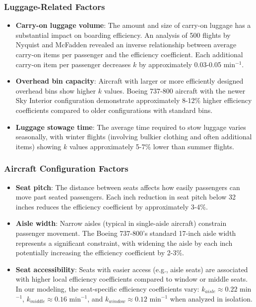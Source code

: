 \documentclass[12pt,a4paper]{article}
\begin{document}
\subsubsection{Luggage-Related Factors}
\begin{itemize}
    \item \textbf{Carry-on luggage volume}: The amount and size of carry-on luggage has a substantial impact on boarding efficiency. An analysis of 500 flights by Nyquist and McFadden \cite{nyquist2008} revealed an inverse relationship between average carry-on items per passenger and the efficiency coefficient. Each additional carry-on item per passenger decreases $k$ by approximately 0.03-0.05 min$^{-1}$.
    
    \item \textbf{Overhead bin capacity}: Aircraft with larger or more efficiently designed overhead bins show higher $k$ values. Boeing 737-800 aircraft with the newer Sky Interior configuration demonstrate approximately 8-12\% higher efficiency coefficients compared to older configurations with standard bins.
    
    \item \textbf{Luggage stowage time}: The average time required to stow luggage varies seasonally, with winter flights (involving bulkier clothing and often additional items) showing $k$ values approximately 5-7\% lower than summer flights.
\end{itemize}

\subsubsection{Aircraft Configuration Factors}
\begin{itemize}
    \item \textbf{Seat pitch}: The distance between seats affects how easily passengers can move past seated passengers. Each inch reduction in seat pitch below 32 inches reduces the efficiency coefficient by approximately 3-4\%.
    
    \item \textbf{Aisle width}: Narrow aisles (typical in single-aisle aircraft) constrain passenger movement. The Boeing 737-800's standard 17-inch aisle width represents a significant constraint, with widening the aisle by each inch potentially increasing the efficiency coefficient by 2-3\%.
    
    \item \textbf{Seat accessibility}: Seats with easier access (e.g., aisle seats) are associated with higher local efficiency coefficients compared to window or middle seats. In our modeling, the seat-specific efficiency coefficients vary: $k_{aisle} \approx 0.22$ min$^{-1}$, $k_{middle} \approx 0.16$ min$^{-1}$, and $k_{window} \approx 0.12$ min$^{-1}$ when analyzed in isolation.
\end{itemize}
\end{document}
